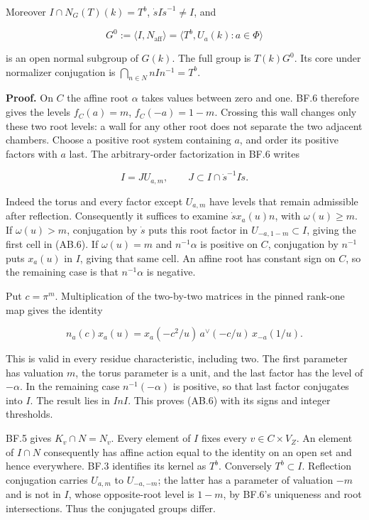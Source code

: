 \documentclass[
  11pt,
]{article}
\begin{document}
Moreover \(I\cap N_G(T)(k)=T^b\), \(\dot s I\dot s^{-1}\ne I\), and

\[
 G^0:=\langle I,N_{\mathrm{aff}}\rangle
     =\langle T^b,U_a(k):a\in\Phi\rangle
\]

is an open normal subgroup of \(G(k)\). The full group is \(T(k)G^0\).
Its core under normalizer conjugation is
\(\bigcap_{n\in N}nIn^{-1}=T^b\).

\textbf{Proof.} On \(C\) the affine root \(\alpha\) takes values between
zero and one. BF.6 therefore gives the levels \(f_C(a)=m\),
\(f_C(-a)=1-m\). Crossing this wall changes only these two root levels:
a wall for any other root does not separate the two adjacent chambers.
Choose a positive root system containing \(a\), and order its positive
factors with \(a\) last. The arbitrary-order factorization in BF.6
writes

\[
 I=J U_{a,m},\qquad J\subset I\cap\dot s^{-1}I\dot s.
 \tag{AB.7}
\]

Indeed the torus and every factor except \(U_{a,m}\) have levels that
remain admissible after reflection. Consequently it suffices to examine
\(\dot s x_a(u)n\), with \(\omega(u)\ge m\). If \(\omega(u)>m\),
conjugation by \(\dot s\) puts this root factor in
\(U_{-a,1-m}\subset I\), giving the first cell in (AB.6). If
\(\omega(u)=m\) and \(n^{-1}\alpha\) is positive on \(C\), conjugation
by \(n^{-1}\) puts \(x_a(u)\) in \(I\), giving that same cell. An affine
root has constant sign on \(C\), so the remaining case is that
\(n^{-1}\alpha\) is negative.

Put \(c=\pi^m\). Multiplication of the two-by-two matrices in the pinned
rank-one map gives the identity

\[
 n_a(c)x_a(u)
 =x_a(-c^2/u)\,a^\vee(-c/u)\,x_{-a}(1/u).
 \tag{AB.8}
\]

This is valid in every residue characteristic, including two. The first
parameter has valuation \(m\), the torus parameter is a unit, and the
last factor has the level of \(-\alpha\). In the remaining case
\(n^{-1}(-\alpha)\) is positive, so that last factor conjugates into
\(I\). The result lies in \(InI\). This proves (AB.6) with its signs and
integer thresholds.

BF.5 gives \(K_v\cap N=N_v\). Every element of \(I\) fixes every
\(v\in C\times V_Z\). An element of \(I\cap N\) consequently has affine
action equal to the identity on an open set and hence everywhere. BF.3
identifies its kernel as \(T^b\). Conversely \(T^b\subset I\).
Reflection conjugation carries \(U_{a,m}\) to \(U_{-a,-m}\); the latter
has a parameter of valuation \(-m\) and is not in \(I\), whose
opposite-root level is \(1-m\), by BF.6's uniqueness and root
intersections. Thus the conjugated groups differ.
\end{document}
